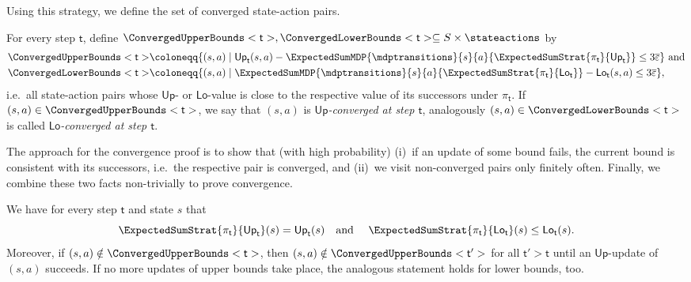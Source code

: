 \documentclass{article}
\newcommand{\States}{S}
\newcommand{\strategy}{\pi}
\newcommand{\upperbound}{\mathsf{Up}}
\newcommand{\lowerbound}{\mathsf{Lo}}
\newcommand{\updatestep}{{\overline{\varepsilon}}}
\newcommand{\algostep}{\mathsf{t}}
\begin{document}
Using this strategy, we define the set of converged state-action pairs.
\begin{definition} \label{def:dql_no_ec:converged_bounds}
	For every step $\algostep$, define $\ConvergedUpperBounds<\algostep>, \ConvergedLowerBounds<\algostep> \subseteq \States \times \stateactions$ by
	\begin{align*}
		\ConvergedUpperBounds<\algostep> & \coloneqq \{(s, a) \mid \upperbound_\algostep(s, a) - \ExpectedSumMDP{\mdptransitions}{s}{a}{\ExpectedSumStrat{\strategy_\algostep}{\upperbound_\algostep}} \leq 3 \updatestep\} \text{ and}\\
		\ConvergedLowerBounds<\algostep> & \coloneqq \{(s, a) \mid \ExpectedSumMDP{\mdptransitions}{s}{a}{\ExpectedSumStrat{\strategy_\algostep}{\lowerbound_\algostep}} - \lowerbound_\algostep(s, a) \leq 3 \updatestep\},
	\end{align*}
	i.e.\ all state-action pairs whose $\upperbound$- or $\lowerbound$-value is close to the respective value of its successors under $\strategy_\algostep$.
	If $(s, a) \in \ConvergedUpperBounds<\algostep>$, we say that $(s, a)$ is \emph{$\upperbound$-converged at step $\algostep$}, analogously $(s, a) \in \ConvergedLowerBounds<\algostep>$ is called \emph{$\lowerbound$-converged at step $\algostep$}.
\end{definition}
The approach for the convergence proof is to show that (with high probability) (i)~if an update of some bound fails, the current bound is consistent with its successors, i.e.\ the respective pair is converged, and (ii)~we visit non-converged pairs only finitely often.
Finally, we combine these two facts non-trivially to prove convergence.
\begin{lemma} \label{stm:dql_no_ec:expected_sum_strategy} \label{stm:dql_no_ec:nonconverged_bounds_monotonic}
	We have for every step $\algostep$ and state $s$ that
	\begin{equation*}
		\ExpectedSumStrat{\strategy_\algostep}{\upperbound_\algostep}(s) = \upperbound_\algostep(s) \text{\quad and \quad} \ExpectedSumStrat{\strategy_\algostep}{\lowerbound_\algostep}(s) \leq \lowerbound_\algostep(s).
	\end{equation*}
	Moreover, if $(s, a) \notin \ConvergedUpperBounds<\algostep>$, then $(s, a) \notin \ConvergedUpperBounds<\algostep'>$ for all $\algostep' > \algostep$ until an $\upperbound$-update of $(s, a)$ succeeds.
	If no more updates of upper bounds take place, the analogous statement holds for lower bounds, too.
\end{lemma}
\end{document}
